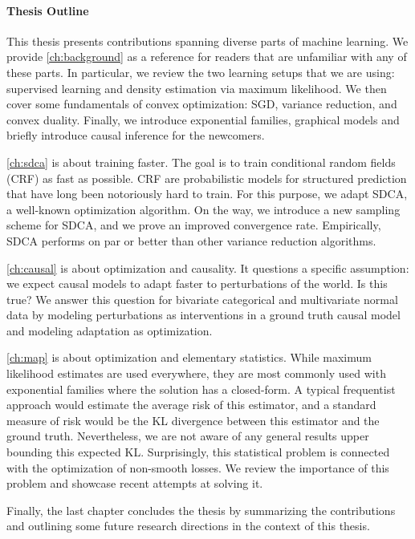 \paragraph{Thesis Outline}
This thesis presents contributions spanning diverse parts of machine learning.
We provide \cref{ch:background} as a reference for readers that are unfamiliar with any of these parts.
In particular, we review the two learning setups that we are using: supervised learning and density estimation via maximum likelihood.
We then cover some fundamentals of convex optimization: SGD, variance reduction, and convex duality.
Finally, we introduce exponential families, graphical models and briefly introduce causal inference for the newcomers.

\cref{ch:sdca} is about training faster.
The goal is to train conditional random fields (CRF) as fast as possible.
CRF are probabilistic models for structured prediction that have long been notoriously hard to train.
For this purpose, we adapt SDCA, a well-known optimization algorithm.
On the way, we introduce a new sampling scheme for SDCA, and we prove an improved convergence rate.
Empirically, SDCA performs on par or better than other variance reduction algorithms.

\cref{ch:causal} is about optimization and causality.
It questions a specific assumption: we expect causal models to adapt faster to perturbations of the world. Is this true?
We answer this question for bivariate categorical and multivariate normal data by modeling perturbations as interventions in a ground truth causal model and modeling adaptation as optimization.

\cref{ch:map} is about optimization and elementary statistics.
While maximum likelihood estimates are used everywhere, they are most commonly used with exponential families where the solution has a closed-form.
A typical frequentist approach would estimate the average risk of this estimator, and a standard measure of risk would be the KL divergence between this estimator and the ground truth.
Nevertheless, we are not aware of any general results upper bounding this expected KL.
Surprisingly, this statistical problem is connected with the optimization of non-smooth losses.
We review the importance of this problem and showcase recent attempts at solving it.

Finally, the last chapter concludes the thesis by summarizing the contributions and outlining some future research directions in the context of this thesis.



